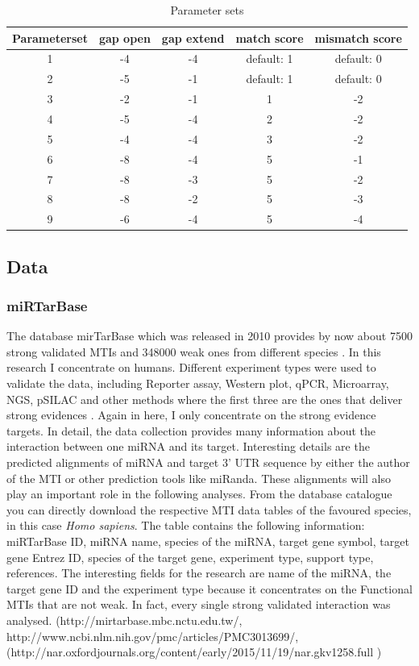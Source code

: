 \documentclass[12pt]{article}
\begin{document}
\begin{table}
\label{table:parameter}
\caption{Parameter sets}
\vspace{0.3cm}
\begin{tabular}{c|c|c|c|c}
Parameterset & gap open & gap extend & match score & mismatch score\\
\hline\hline 
1 & -4 & -4 & default: 1 & default: 0\\
2 & -5 & -1 & default: 1 & default: 0\\
3 & -2 & -1 & 1 & -2 \\
4 & -5 & -4 & 2 & -2 \\
5 & -4 & -4 & 3 & -2 \\
6 & -8 & -4 & 5 & -1 \\
7 & -8 & -3 & 5 & -2 \\
8 & -8 & -2 & 5 & -3 \\
9 & -6 & -4 & 5 & -4 \\
\hline
\end{tabular}
\end{table}

 
\subsection{Data} 
\subsubsection{miRTarBase}
The database mirTarBase which was released in 2010 provides by now about 7500 strong validated MTIs and 348000 weak ones from different species \cite{Chou}. In this research I concentrate on humans. Different experiment types were used to validate the data, including Reporter assay, Western plot, qPCR, Microarray, NGS, pSILAC and other methods where the first three are the ones that deliver strong evidences \cite{Hsu}. Again in here, I only concentrate on the strong evidence targets. In detail, the data collection provides many information about the interaction between one miRNA and its target. Interesting details are the predicted alignments of miRNA and target 3' UTR sequence by either the author of the MTI or other prediction tools like miRanda. These alignments will also play an important role in the following analyses. From the database catalogue you can directly download the respective MTI data tables of the favoured species, in this case \textit{Homo sapiens}. The table contains the following information: miRTarBase ID, miRNA name, species of the miRNA, target gene symbol, target gene Entrez ID, species of the target gene, experiment type, support type, references. The interesting fields for the research are name of the miRNA, the target gene ID and the experiment type because it concentrates on the Functional MTIs that are not weak. In fact, every single strong validated interaction was analysed. (http://mirtarbase.mbc.nctu.edu.tw/, http://www.ncbi.nlm.nih.gov/pmc/articles/PMC3013699/, (http://nar.oxfordjournals.org/content/early/2015/11/19/nar.gkv1258.full )
\end{document}
